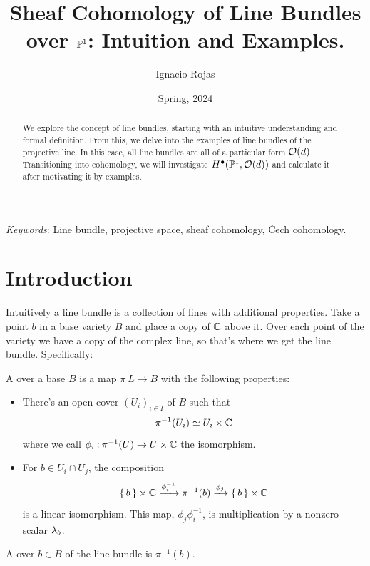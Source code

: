 \documentclass[12pt]{memoir}
\title{Sheaf Cohomology of Line Bundles over $\mathbb{P}^1$: Intuition and Examples.}
\author{Ignacio Rojas}
\date{Spring, 2024}
\begin{document}
\bgroup
\renewcommand\thesection{\arabic{section}}
\renewcommand{\thefigure}{\arabic{figure}}
\maketitle
\begin{abstract}
    We explore the concept of line bundles, starting with an intuitive understanding and formal definition. From this, we delve into the examples of line bundles of the projective line. In this case, all line bundles are all of a particular form $\mathcal{O}(d)$. Transitioning into cohomology, we will investigate $H^{\bullet}(\mathbb{P}^1,\mathcal{O}(d))$ and calculate it after motivating it by examples.
    \end{abstract}
    
    \begin{flushleft}
    \small
    \emph{Keywords}:
    Line bundle, projective space, sheaf cohomology, \v{C}ech cohomology.
    
    \end{flushleft}
    \section{Introduction}

    Intuitively a line bundle is a collection of lines with additional properties. Take a point $b$ in a base variety $B$ and place a copy of $\mathbb{C}$ above it. Over each point of the variety we have a copy of the complex line, so that's where we get the line bundle. Specifically:

    \begin{Def}
        A  over a base $B$ is a map $\pi\: L\to B$ with the following properties:
        \begin{itemize}
            \item There's an open cover $(U_i)_{i\in I}$ of $B$ such that 
            $$\pi^{-1}(U_i)\simeq U_i\times\mathbb{C}$$
            where we call $\phi_i\mathbin{:}\pi^{-1}(U)\to U\times\mathbb{C}$ the isomorphism.
            \item For $b\in U_i\cap U_j$, the composition
            $$\{\,b\,\}\times\mathbb{C}\xrightarrow[]{\phi_i^{-1}}\pi^{-1}(b)\xrightarrow[]{\phi_j}\{\,b\,\}\times\mathbb{C}$$
            is a linear isomorphism. This map, $\phi_j\phi_i^{-1}$, is multiplication by a nonzero scalar $\lambda_b$.
        \end{itemize}
        A  over $b\in B$ of the line bundle is $\pi^{-1}(b)$.
    \end{Def}
    
\end{document}
